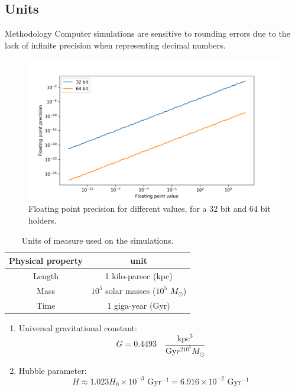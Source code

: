 \documentclass{beamer}
\newcommand{\sm}[0]{$M_\odot$}
\begin{document}
\subsection{Units}
\begin{frame}{Methodology}
	Computer simulations are sensitive to rounding errors due to the lack of infinite precision when representing decimal numbers.
	\begin{figure}[h]
		\centering
		\includegraphics[width=0.7\linewidth]{"../Files/Week 3/floating"}
		\caption{Floating point precision for different values, for a 32 bit and 64 bit holders.}
		\label{fig: IEEE-754}
	\end{figure}
\end{frame}

\begin{frame}{}
	\begin{table}[h]
		\centering
		\caption{Units of measure used on the simulations.}
		\label{tb: units}
		\begin{tabular}{c|c}
			\hline
			\textbf{Physical property} & \textbf{unit} \\
			\hline
			Length & 1 kilo-parsec (kpc) \\
			Mass & $10^5$ solar masses ($10^5$ \sm) \\
			Time & 1 giga-year (Gyr) \\
			\hline
		\end{tabular}
	\end{table}
	\begin{enumerate}
		\item Universal gravitational constant:
		\begin{equation}
			G = 0.4493 \quad \dfrac{\text{kpc$^3$}}{\text{Gy$r^210^5$\sm}}
		\end{equation}
		\item Hubble parameter:
			\begin{equation}
			H \approx 1.023 H_0 \times10^{-3} \text{ Gyr$^{-1}$} = 6.916\times10^{-2}\text{ Gyr$^{-1}$}
			\end{equation}
	\end{enumerate}
\end{frame}
\end{document}
